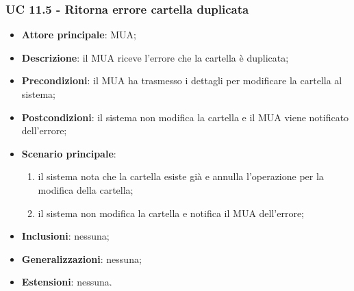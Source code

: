 \subsubsection{UC 11.5 - Ritorna errore cartella duplicata} \label{sec:UC11.5}
\begin{itemize}
    \item \textbf{Attore principale}: MUA;
    \item \textbf{Descrizione}: il MUA riceve l'errore che la cartella è duplicata;
    \item \textbf{Precondizioni}: il MUA ha trasmesso i dettagli per modificare la cartella al sistema;
    \item \textbf{Postcondizioni}: il sistema non modifica la cartella e il MUA viene notificato dell'errore;
    \item \textbf{Scenario principale}:
        \begin{enumerate}
            \item il sistema nota che la cartella esiste già e annulla l'operazione per la modifica della cartella;
            \item il sistema non modifica la cartella e notifica il MUA dell'errore;
        \end{enumerate}
    \item \textbf{Inclusioni}: nessuna;
    \item \textbf{Generalizzazioni}: nessuna;
    \item \textbf{Estensioni}: nessuna.
\end{itemize}

